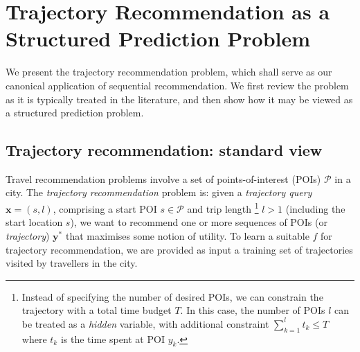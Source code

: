 
\secmoveup
\section{Trajectory Recommendation as a Structured Prediction Problem}
\label{sec:trajrec}
\textmoveup

We present the trajectory recommendation problem,
which shall serve as our canonical application of sequential recommendation.
We first review the problem as it is typically treated in the literature,
and then show how it may be viewed as a structured prediction problem.

\secmoveup
\subsection{Trajectory recommendation: standard view}

Travel recommendation problems involve a set of points-of-interest (POIs) $\mathcal{P}$ in a city.
The \emph{trajectory recommendation} problem is: given a \emph{trajectory query} $\mathbf{x} = (s, l)$,
comprising a start POI $s \in \mathcal{P}$ and trip length
\footnote{Instead of specifying the number of desired POIs, 
we can constrain the trajectory with a total time budget $T$. 
In this case, the number of POIs $l$ can be treated as a \emph{hidden} variable, 
with additional constraint $\sum_{k=1}^l t_k \le T$ where $t_k$ is the time spent at POI $y_k$.}
$l > 1$ (including the start location $s$),
we want to recommend one or more sequences of POIs (or \emph{trajectory}) $\mathbf{y}^*$ that maximises some notion of utility.
To learn a suitable $f$ for trajectory recommendation,
we are provided as input a training set
of trajectories visited by travellers in the city.

%

